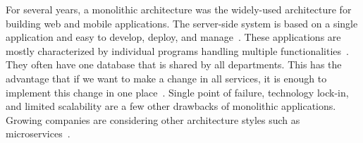 \par For several years, a monolithic architecture was the widely-used architecture for building web and mobile applications. The server-side system is based on a single application and easy to develop, deploy, and manage~\cite{Danbettinger2019}. These applications are mostly characterized by individual programs handling multiple functionalities~\cite{Francesco2019}. They often have one database that is shared by all departments. This has the advantage that if we want to make a change in all services, it is enough to implement this change in one place~\cite{Pavlovic2020}. 
Single point of failure, technology lock-in, and limited scalability are a few other drawbacks of monolithic applications. Growing companies are considering other architecture styles such as microservices~\cite{Lenga2019, Jag2017, Rodrigue2016}. 




